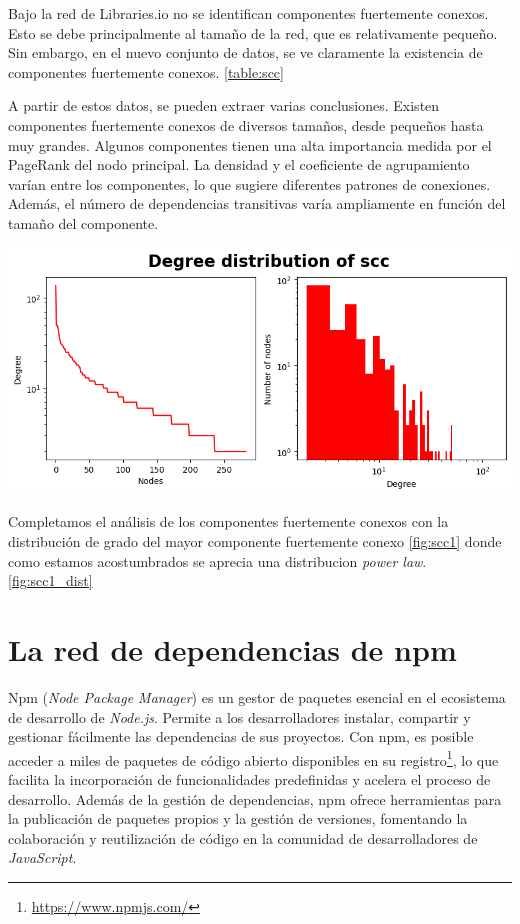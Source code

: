 Bajo la red de Libraries.io no se identifican componentes fuertemente conexos. Esto se debe principalmente
al tamaño de la red, que es relativamente pequeño. Sin embargo, en el nuevo conjunto de datos, se ve claramente
la existencia de componentes fuertemente conexos. \ref{table:scc}

A partir de estos datos, se pueden extraer varias conclusiones. Existen componentes fuertemente conexos de diversos
tamaños, desde pequeños hasta muy grandes. Algunos componentes tienen una alta importancia medida por el PageRank
del nodo principal. La densidad y el coeficiente de agrupamiento varían entre los componentes, lo que sugiere diferentes
patrones de conexiones. Además, el número de dependencias transitivas varía ampliamente en función del tamaño del componente.

    \begin{center}
        \includegraphics[width=1\textwidth]{img/pypi/scc1_dist.png}
        \label{fig:scc1_dist}
    \end{center}



Completamos el análisis de los componentes fuertemente conexos con la distribución de grado del mayor componente fuertemente
conexo \ref{fig:scc1} donde como estamos acostumbrados se aprecia una distribucion \textit{power law}. \ref{fig:scc1_dist}


\newpage
\section{La red de dependencias de npm}

Npm (\textit{Node Package Manager}) es un gestor de paquetes esencial en el ecosistema de
desarrollo de \textit{Node.js}. Permite a los desarrolladores instalar, compartir y gestionar
fácilmente las dependencias de sus proyectos. Con npm, es posible acceder a miles de
paquetes de código abierto disponibles en su registro\footnote{\url{https://www.npmjs.com/}},
lo que facilita la incorporación de funcionalidades predefinidas y acelera el proceso de
desarrollo. Además de la gestión de dependencias, npm ofrece herramientas para la publicación
de paquetes propios y la gestión de versiones, fomentando la colaboración y reutilización de
código en la comunidad de desarrolladores de \textit{JavaScript}.

